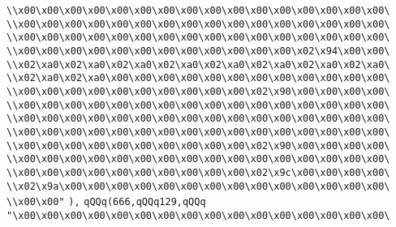 \verb|\\x00\x00\x00\x00\x00\x00\x00\x00\x00\x00\x00\x00\x00\x00\x00\x00\|\newline
\verb|\\x00\x00\x00\x00\x00\x00\x00\x00\x00\x00\x00\x00\x00\x00\x00\x00\|\newline
\verb|\\x00\x00\x00\x00\x00\x00\x00\x00\x00\x00\x00\x00\x00\x00\x00\x00\|\newline
\verb|\\x00\x00\x00\x00\x00\x00\x00\x00\x00\x00\x00\x00\x02\x94\x00\x00\|\newline
\verb|\\x02\xa0\x02\xa0\x02\xa0\x02\xa0\x02\xa0\x02\xa0\x02\xa0\x02\xa0\|\newline
\verb|\\x02\xa0\x02\xa0\x00\x00\x00\x00\x00\x00\x00\x00\x00\x00\x00\x00\|\newline
\verb|\\x00\x00\x00\x00\x00\x00\x00\x00\x00\x00\x02\x90\x00\x00\x00\x00\|\newline
\verb|\\x00\x00\x00\x00\x00\x00\x00\x00\x00\x00\x00\x00\x00\x00\x00\x00\|\newline
\verb|\\x00\x00\x00\x00\x00\x00\x00\x00\x00\x00\x00\x00\x00\x00\x00\x00\|\newline
\verb|\\x00\x00\x00\x00\x00\x00\x00\x00\x00\x00\x00\x00\x00\x00\x00\x00\|\newline
\verb|\\x00\x00\x00\x00\x00\x00\x00\x00\x00\x00\x02\x90\x00\x00\x00\x00\|\newline
\verb|\\x00\x00\x00\x00\x00\x00\x00\x00\x00\x00\x00\x00\x00\x00\x00\x00\|\newline
\verb|\\x00\x00\x00\x00\x00\x00\x00\x00\x00\x00\x02\x9c\x00\x00\x00\x00\|\newline
\verb|\\x02\x9a\x00\x00\x00\x00\x00\x00\x00\x00\x00\x00\x00\x00\x00\x00\|\newline
\verb|\\x00\x00"|\newline
\verb|),|\newline
\verb|qQQq(666,qQQq129,qQQq|\newline
\verb|"\x00\x00\x00\x00\x00\x00\x00\x00\x00\x00\x00\x00\x00\x00\x00\x00\|\newline
